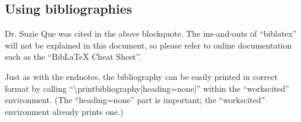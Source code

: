 \documentclass[mla8]{mla}
\begin{document}
\begin{paper}
\section{Using bibliographies}

Dr. Suzie Que was cited in the above blockquote.
The ins-and-outs of ``biblatex'' will not be explained in this
document, so please refer to online documentation such as the
``BibLaTeX Cheat Sheet''.

Just as with the endnotes,
the bibliography can be easily printed in correct format by calling
``\textbackslash{}printbibliography[heading=none]'' within the
``workscited'' environment.
(The ``heading=none'' part is important; the ``workscited'' environment
already prints one.)

\end{paper}

\begin{notes}

\printendnotes[mla]

\end{notes}

\begin{workscited}

\printbibliography[heading=none]

\end{workscited}
\end{document}
